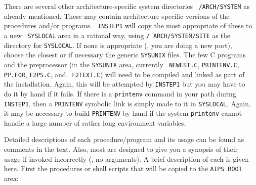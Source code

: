 There are several other architecture-specific system directories {\tt
\thisver/\dol ARCH/SYSTEM} as already mentioned.  These may contain
architecture-specific versions of the procedures and/or programs.  {\tt
INSTEP1} will copy the most appropriate of these to a new {\tt\dol
SYSLOCAL} area in a rational way, using {\tt\thisver/\dol
ARCH/SYS\-TEM/\dol SITE} as the directory for {\tt\dol SYSLOCAL}.  If none
is appropriate (\ie, you are doing a new port), choose the closest or if
necessary the generic {\tt \dol SYSUNIX} files.  The few C programs and
the preprocessor (in the {\tt \dol SYSUNIX} area, currently {\tt
NEWEST.C}, {\tt PRINTENV.C}, {\tt PP.FOR}, {\tt F2PS.C}, and {\tt
F2TEXT.C}) will need to be compiled and linked as part of the
installation.  Again, this will be attempted by {\tt INSTEP1} but you may
have to do it by hand if it fails.  If there is a {\tt printenv} command
in your path during {\tt INSTEP1}, then a {\tt PRINTENV} symbolic link is
simply made to it in {\tt\dol SYSLOCAL}.  Again, it may be necessary to
build {\tt PRINTENV} by hand if the system {\tt printenv} cannot handle a
large number of rather long environment variables.

Detailed descriptions of each procedure/program and its usage can be found
as comments in the text.  Also, most are designed to give you a synopsis
of their usage if invoked incorrectly (\eg, no arguments).  A brief
description of each is given here.  First the procedures or shell scripts
that will be copied to the {\tt\dol AIPS ROOT} area:\medskip

